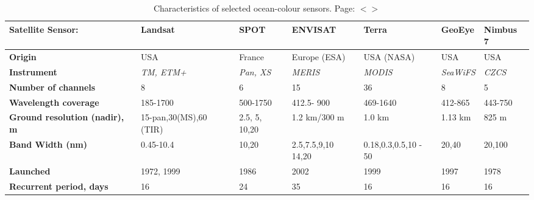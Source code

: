 \documentclass[11pt]{article}
\begin{document}
\begin{table}[htbp]
	\caption{Characteristics of selected ocean-colour sensors. Page: $<$\pageref{page-47}$>$}
	\begin{center}
		\begin{tabular}{|p{2cm}|p{20mm}|p{15mm}|p{17mm}|p{15mm}|p{15mm}|p{15mm}|}
			\hline\hline
			\textbf{Satellite Sensor:} & {\textbf{Landsat}} & {\textbf{SPOT}} & {\textbf{ENVISAT}} & {\textbf{Terra}} & {\textbf{GeoEye}} & {\textbf{Nimbus 7}} \\ \hline\hline
				\textbf{Origin} & USA & France & Europe (ESA) & USA (NASA) & USA & USA \\ \hline
				\textbf{Instrument} & \textit{TM, ETM+} & \textit{Pan, XS} & \textit{MERIS} & \textit{MODIS} & \textit{SeaWiFS} & \textit{CZCS}\\ \hline
			\textbf{Number of channels} & 8 & 6 & 15 & 36 & 8 & 5 \\ \hline
			\textbf{Wavelength coverage} & 185-1700 & 500-1750 & 412.5- 900 & 469-1640 & 412-865 & 443-750 \\ \hline
			\textbf{Ground resolution (nadir), m} & 15-pan,30(MS),60 (TIR) & 2.5, 5, 10,20 & 1.2 km/300 m & 1.0 km & 1.13 km & 825 m \\ \hline
			\textbf{Band Width (nm)} & 0.45-10.4 & 10,20 & 2.5,7.5,9,10 14,20 & 0.18,0.3,0.5,10 - 50 & 20,40 & 20,100 \\ \hline
			\textbf{Launched} & 1972, 1999 & 1986 & 2002 & 1999 & 1997 & 1978 \\ \hline
			\textbf{Recurrent period, days} & 16 & 24 & 35 & 16 & 16 & 16 \\ \hline
		\end{tabular}
	\end{center}
	\label{tab:1}
\end{table}
\end{document}
